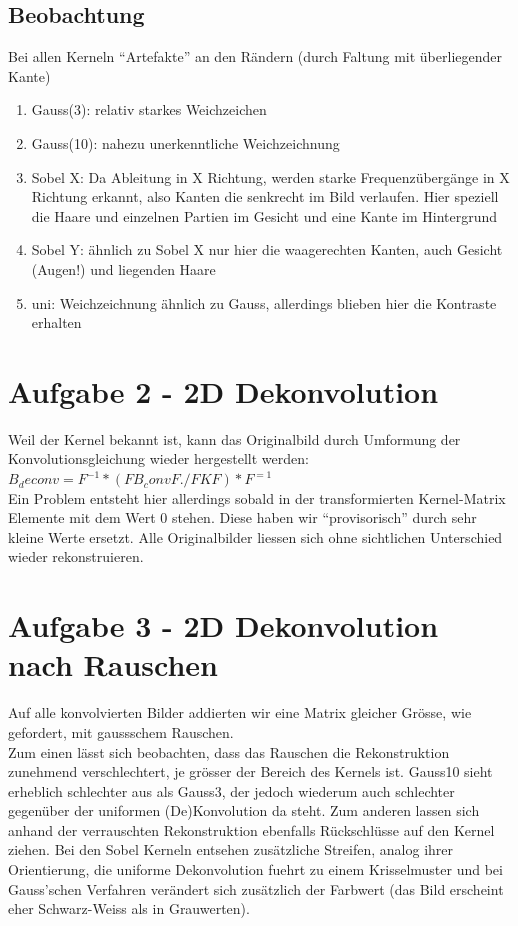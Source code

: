 \subsection*{Beobachtung}
Bei allen Kerneln ``Artefakte'' an den R\"andern (durch Faltung mit \"uberliegender Kante)
\begin{enumerate}
\item Gauss(3): relativ starkes Weichzeichen
\item Gauss(10): nahezu unerkenntliche Weichzeichnung
\item Sobel X: Da Ableitung in X Richtung, werden starke Frequenz\"uberg\"ange in X Richtung
erkannt, also Kanten die senkrecht im Bild verlaufen. Hier speziell die Haare und einzelnen 
Partien im Gesicht und eine Kante im Hintergrund
\item Sobel Y: \"ahnlich zu Sobel X nur hier die waagerechten Kanten, auch Gesicht (Augen!) und
liegenden Haare
\item uni: Weichzeichnung \"ahnlich zu Gauss, allerdings blieben hier die Kontraste erhalten
\end{enumerate}

\section*{Aufgabe 2 - 2D Dekonvolution}
Weil der Kernel bekannt ist, kann das Originalbild durch Umformung der Konvolutionsgleichung
wieder hergestellt werden: $B_deconv=F^{-1}*(FB_convF ./ FKF)*F^{=1}$
\\
Ein Problem entsteht hier allerdings sobald in der transformierten Kernel-Matrix Elemente mit
dem Wert $0$ stehen. Diese haben wir ``provisorisch'' durch sehr kleine Werte ersetzt. 
Alle Originalbilder liessen sich ohne sichtlichen Unterschied wieder rekonstruieren.

\section*{Aufgabe 3 - 2D Dekonvolution nach Rauschen}
Auf alle konvolvierten Bilder addierten wir eine Matrix gleicher Gr\"osse, wie gefordert, mit
gaussschem Rauschen.
\\
Zum einen l\"asst sich beobachten, dass das Rauschen die Rekonstruktion zunehmend
verschlechtert, je gr\"osser der Bereich des Kernels ist. Gauss10 sieht erheblich schlechter
aus als Gauss3, der jedoch wiederum auch schlechter gegen\"uber der uniformen (De)Konvolution
da steht. Zum anderen lassen sich anhand der verrauschten Rekonstruktion ebenfalls R\"uckschl\"usse auf den Kernel ziehen. Bei den Sobel Kerneln entsehen zus\"atzliche Streifen, analog
ihrer Orientierung, die uniforme Dekonvolution fuehrt zu einem Krisselmuster und bei Gauss'schen Verfahren ver\"andert sich zus\"atzlich der Farbwert (das Bild erscheint eher Schwarz-Weiss als in Grauwerten).

